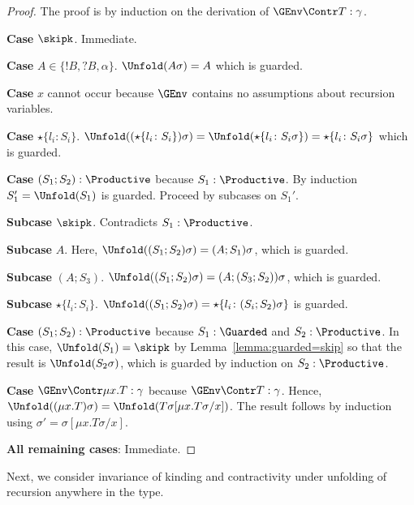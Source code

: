 \begin{proof}
  The proof is by induction on the derivation of $\GEnv \Contr T :
  \gamma$.

  \textbf{Case }$\skipk$. Immediate.

  \textbf{Case }$A \in \{ {!B}, {?B}, \alpha\}$. $\Unfold (A\sigma) = A$ which is guarded.

  \textbf{Case }$x$ cannot occur because $\GEnv$ 
  contains no assumptions about recursion variables.

  \textbf{Case }$\star\{l_i\colon S_i\}$. $\Unfold
  ((\star\{l_i\colon S_i\})\sigma) = \Unfold (\star\{l_i\colon
  S_i\sigma\}) = \star\{l_i\colon S_i\sigma\}$ which is guarded.


  \textbf{Case }$(S_1;S_2) : \Productive$ because $S_1 :
  \Productive$. By induction $S_1' = \Unfold (S_1)$ is
  guarded. Proceed by subcases on $S_1'$.

  \textbf{Subcase }$\skipk$. Contradicts $S_1 : \Productive$.

  \textbf{Subcase }$A$. Here, $\Unfold ((S_1;S_2)\sigma) = (A;
  S_1)\sigma$, which is guarded.

  \textbf{Subcase }$(A; S_3)$. $\Unfold
  ((S_1;S_2)\sigma) = (A; (S_3; S_2))\sigma$, which is guarded. 

  \textbf{Subcase }$\star\{l_i\colon S_i\}$. $\Unfold
  ((S_1;S_2)\sigma) = \star\{l_i\colon (S_i; S_2)\sigma\}$ is guarded.


  \textbf{Case }$(S_1;S_2) : \Productive$ because $S_1 :
  \Guarded$ and $S_2 : \Productive$. In this case, $\Unfold (S_1) =
  \skipk$ by Lemma~\ref{lemma:guarded=skip} so that the result is
  $\Unfold (S_2\sigma)$, which is guarded by induction on $S_2 : \Productive$.

  \textbf{Case }$\GEnv \Contr \mu x.T : \gamma$ because $\GEnv \Contr
  T : \gamma$. Hence, $\Unfold ((\mu x.T)\sigma) = \Unfold (T\sigma[\mu
  x.T\sigma/x])$. The result follows by induction using $\sigma' = \sigma[\mu
  x.T\sigma/x]$.


  \textbf{All remaining cases}: Immediate.
\end{proof}

Next, we consider invariance of kinding and contractivity under
unfolding of recursion anywhere in the type.

